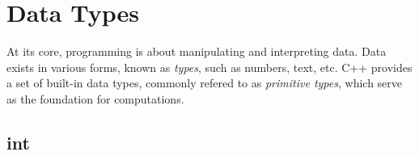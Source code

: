 \section{Data Types}

\noindent
At its core, programming is about manipulating and interpreting data.
Data exists in various forms, known as \textit{types}, such as numbers, text, etc.
C++ provides a set of built-in data types, commonly refered to as \textit{primitive types}, which serve as the foundation for computations.

\subsection{int}


